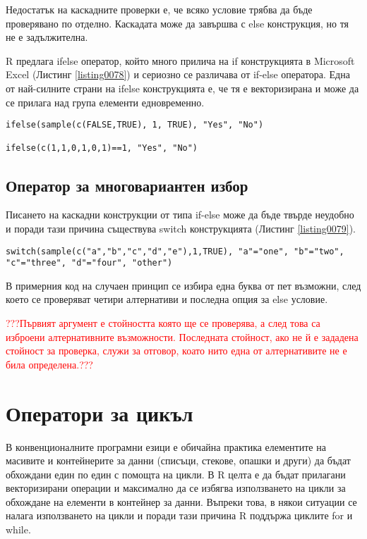 Недостатък на каскадните проверки е, че всяко условие трябва да бъде проверявано по отделно. Каскадата може да завършва с else конструкция, но тя не е задължителна.

R предлага ifelse оператор, който много прилича на if конструкцията в Microsoft Excel (Листинг \ref{listing0078}) и сериозно се различава от if-else оператора. Една от най-силните страни на ifelse конструкцията е, че тя е векторизирана и може да се прилага над група елементи едновременно.

\begin{lstlisting}[caption=Функцията ifelse, label=listing0078]
ifelse(sample(c(FALSE,TRUE), 1, TRUE), "Yes", "No")

ifelse(c(1,1,0,1,0,1)==1, "Yes", "No")
\end{lstlisting}

\subsection{Оператор за многовариантен избор}

Писането на каскадни конструкции от типа if-else може да бъде твърде неудобно и поради тази причина съществува switch конструкцията (Листинг \ref{listing0079}).

\begin{lstlisting}[caption=Конструкция за многовариантен избор switch, label=listing0079]
switch(sample(c("a","b","c","d","e"),1,TRUE), "a"="one", "b"="two", "c"="three", "d"="four", "other")
\end{lstlisting}

В примерния код на случаен принцип се избира една буква от пет възможни, след което се проверяват четири алтернативи и последна опция за else условие.

\textcolor{red}{???Първият аргумент е стойността която ще се проверява, а след това са изброени алтернативните възможности. Последната стойност, ако не й е зададена стойност за проверка, служи за отговор, коато нито една от алтернативите не е била определена.???}

\section{Оператори за цикъл}

В конвенционалните програмни езици е обичайна практика елементите на масивите и контейнерите за данни (списъци, стекове, опашки и други) да бъдат обхождани един по един с помощта на цикли. В R целта е да бъдат прилагани векторизирани операции и максимално да се избягва използването на цикли за обхождане на елементи в контейнер за данни. Въпреки това, в някои ситуации се налага използването на цикли и поради тази причина R поддържа циклите for и while.

